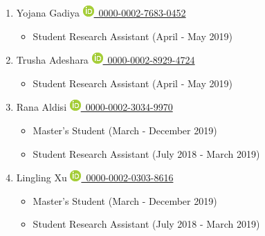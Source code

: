 \documentclass[11pt,a4paper,sans]{moderncv} %
\begin{document}
\begin{enumerate}
        \item
            Yojana Gadiya {\scriptsize     \href{https://orcid.org/0000-0002-7683-0452}{\includegraphics[scale=0.5]{img/ORCIDiD_icon16x16}\ 0000-0002-7683-0452}
}    \begin{itemize}
        \item
    {\scriptsize Student Research Assistant (April - May 2019)}
    \end{itemize}

        \item
            Trusha Adeshara {\scriptsize     \href{https://orcid.org/0000-0002-8929-4724}{\includegraphics[scale=0.5]{img/ORCIDiD_icon16x16}\ 0000-0002-8929-4724}
}    \begin{itemize}
        \item
    {\scriptsize Student Research Assistant (April - May 2019)}
    \end{itemize}

        \item
            Rana Aldisi {\scriptsize     \href{https://orcid.org/0000-0002-3034-9970}{\includegraphics[scale=0.5]{img/ORCIDiD_icon16x16}\ 0000-0002-3034-9970}
}    \begin{itemize}
        \item
    {\scriptsize Master's Student (March - December 2019)}
        \item
    {\scriptsize Student Research Assistant (July 2018 - March 2019)}
    \end{itemize}

        \item
            Lingling Xu {\scriptsize     \href{https://orcid.org/0000-0002-0303-8616}{\includegraphics[scale=0.5]{img/ORCIDiD_icon16x16}\ 0000-0002-0303-8616}
}    \begin{itemize}
        \item
    {\scriptsize Master's Student (March - December 2019)}
        \item
    {\scriptsize Student Research Assistant (July 2018 - March 2019)}
    \end{itemize}


\end{enumerate}
\end{document}
